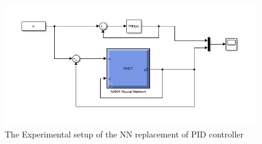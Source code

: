 \documentclass{article}
\begin{document}
\begin{figure}
\centering
\includegraphics[scale=0.65]{PID_NN.jpg}
\caption{\label{fig:compare_rbf} The Experimental setup of the NN replacement of PID controller}
\end{figure}
\end{document}
